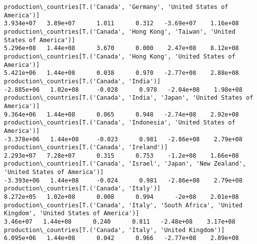 \documentclass[11pt]{article}
\begin{document}
\begin{Verbatim}[commandchars=\\\{\}]
production\_countries[T.('Canada', 'Germany', 'United States of America')]                                                                                                              3.934e+07   3.89e+07      1.011      0.312   -3.69e+07    1.16e+08
production\_countries[T.('Canada', 'Hong Kong', 'Taiwan', 'United States of America')]                                                                                                  5.296e+08   1.44e+08      3.670      0.000    2.47e+08    8.12e+08
production\_countries[T.('Canada', 'Hong Kong', 'United States of America')]                                                                                                            5.421e+06   1.44e+08      0.038      0.970   -2.77e+08    2.88e+08
production\_countries[T.('Canada', 'India')]                                                                                                                                           -2.885e+06   1.02e+08     -0.028      0.978   -2.04e+08    1.98e+08
production\_countries[T.('Canada', 'India', 'Japan', 'United States of America')]                                                                                                       9.364e+06   1.44e+08      0.065      0.948   -2.74e+08    2.92e+08
production\_countries[T.('Canada', 'Indonesia', 'United States of America')]                                                                                                           -3.378e+06   1.44e+08     -0.023      0.981   -2.86e+08    2.79e+08
production\_countries[T.('Canada', 'Ireland')]                                                                                                                                          2.293e+07   7.28e+07      0.315      0.753    -1.2e+08    1.66e+08
production\_countries[T.('Canada', 'Israel', 'Japan', 'New Zealand', 'United States of America')]                                                                                      -3.393e+06   1.44e+08     -0.024      0.981   -2.86e+08    2.79e+08
production\_countries[T.('Canada', 'Italy')]                                                                                                                                            8.272e+05   1.02e+08      0.008      0.994      -2e+08    2.01e+08
production\_countries[T.('Canada', 'Italy', 'South Africa', 'United Kingdom', 'United States of America')]                                                                               3.46e+07   1.44e+08      0.240      0.811   -2.48e+08    3.17e+08
production\_countries[T.('Canada', 'Italy', 'United Kingdom')]                                                                                                                          6.095e+06   1.44e+08      0.042      0.966   -2.77e+08    2.89e+08

\end{Verbatim}
\end{document}
